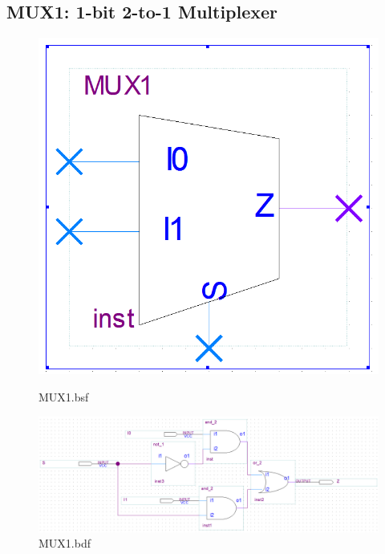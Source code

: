 \documentclass[12pt,a4paper]{article}
\begin{document}
  \subsection{MUX1: 1-bit 2-to-1 Multiplexer}
  \begin{figure}[H]
    \centering
    \begin{subcaptionblock}{0.15\linewidth}
      \includegraphics[width=\linewidth]{Lab2_2/MUX1_bsf.png}
      \caption{MUX1.bsf}
    \end{subcaptionblock}
    \begin{subcaptionblock}{0.84\linewidth}
      \includegraphics[width=\linewidth]{Lab2_2/MUX1_bdf.png}
      \caption{MUX1.bdf}
    \end{subcaptionblock}
  \end{figure}
\end{document}
